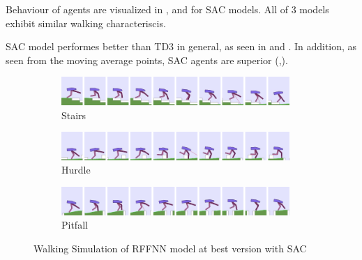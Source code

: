 Behaviour of agents are visualized in ,  and  for SAC models. 
All of 3 models exhibit similar walking characteriscis.

SAC model performes better than TD3 in general, as seen in  and . 
In addition, as seen from the moving average points, SAC agents are superior (,).

\begin{figure}[!ht]
	\centering
	\begin{subfigure}{.95\textwidth}
		\centering
		\includegraphics[width=0.95\textwidth]{figures/bipedal/anim/ff-stairs.png}
		\caption{Stairs}
		\label{fig:anim_rffnn_stairs}
	\end{subfigure}
	\begin{subfigure}{.95\textwidth}
		\centering
		\includegraphics[width=0.95\textwidth]{figures/bipedal/anim/ff-hurdle.png}
		\caption{Hurdle}
		\label{fig:anim_rffnn_hurdle}
	\end{subfigure}
	\begin{subfigure}{.95\textwidth}
		\centering
		\includegraphics[width=0.95\textwidth]{figures/bipedal/anim/ff-pitfall.png}
		\caption{Pitfall}
		\label{fig:anim_rffnn_pitfall}
	\end{subfigure}
	\caption{Walking Simulation of RFFNN model at best version with SAC}
	\label{fig:rffnn_simulation}
\end{figure}

